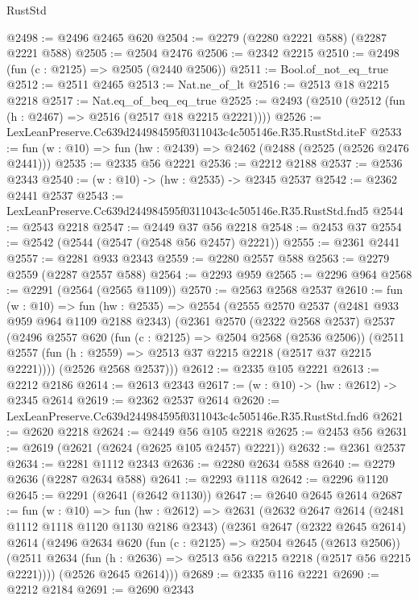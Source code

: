 \begin{lexlean}{RustStd}
\begin{coremodule}
@2498 := @2496 @2465 @620
@2504 := @2279 (@2280 @2221 @588) (@2287 @2221 @588)
@2505 := @2504 @2476
@2506 := @2342 @2215
@2510 := @2498 (fun (c : @2125) => @2505 (@2440 @2506))
@2511 := Bool.of_not_eq_true
@2512 := @2511 @2465
@2513 := Nat.ne_of_lt
@2516 := @2513 @18 @2215 @2218
@2517 := Nat.eq_of_beq_eq_true
@2525 := @2493 (@2510 (@2512 (fun (h : @2467) => @2516 (@2517 @18 @2215 @2221))))
@2526 := LexLeanPreserve.Cc639d244984595f0311043c4c505146e.R35.RustStd.iteF
@2533 := fun (w : @10) => fun (hw : @2439) => @2462 (@2488 (@2525 (@2526 @2476 @2441)))
@2535 := @2335 @56 @2221
@2536 := @2212 @2188
@2537 := @2536 @2343
@2540 := (w : @10) -> (hw : @2535) -> @2345 @2537
@2542 := @2362 @2441 @2537
@2543 := LexLeanPreserve.Cc639d244984595f0311043c4c505146e.R35.RustStd.fnd5
@2544 := @2543 @2218
@2547 := @2449 @37 @56 @2218
@2548 := @2453 @37
@2554 := @2542 (@2544 (@2547 (@2548 @56 @2457) @2221))
@2555 := @2361 @2441
@2557 := @2281 @933 @2343
@2559 := @2280 @2557 @588
@2563 := @2279 @2559 (@2287 @2557 @588)
@2564 := @2293 @959
@2565 := @2296 @964
@2568 := @2291 (@2564 (@2565 @1109))
@2570 := @2563 @2568 @2537
@2610 := fun (w : @10) =>
  fun (hw : @2535) =>
  @2554
    (@2555
      @2570
      @2537
      (@2481 @933 @959 @964 @1109 @2188 @2343)
      (@2361
        @2570
        (@2322 @2568 @2537)
        @2537
        (@2496
          @2557
          @620
          (fun (c : @2125) => @2504 @2568 (@2536 @2506))
          (@2511 @2557 (fun (h : @2559) => @2513 @37 @2215 @2218 (@2517 @37 @2215 @2221))))
        (@2526 @2568 @2537)))
@2612 := @2335 @105 @2221
@2613 := @2212 @2186
@2614 := @2613 @2343
@2617 := (w : @10) -> (hw : @2612) -> @2345 @2614
@2619 := @2362 @2537 @2614
@2620 := LexLeanPreserve.Cc639d244984595f0311043c4c505146e.R35.RustStd.fnd6
@2621 := @2620 @2218
@2624 := @2449 @56 @105 @2218
@2625 := @2453 @56
@2631 := @2619 (@2621 (@2624 (@2625 @105 @2457) @2221))
@2632 := @2361 @2537
@2634 := @2281 @1112 @2343
@2636 := @2280 @2634 @588
@2640 := @2279 @2636 (@2287 @2634 @588)
@2641 := @2293 @1118
@2642 := @2296 @1120
@2645 := @2291 (@2641 (@2642 @1130))
@2647 := @2640 @2645 @2614
@2687 := fun (w : @10) =>
  fun (hw : @2612) =>
  @2631
    (@2632
      @2647
      @2614
      (@2481 @1112 @1118 @1120 @1130 @2186 @2343)
      (@2361
        @2647
        (@2322 @2645 @2614)
        @2614
        (@2496
          @2634
          @620
          (fun (c : @2125) => @2504 @2645 (@2613 @2506))
          (@2511 @2634 (fun (h : @2636) => @2513 @56 @2215 @2218 (@2517 @56 @2215 @2221))))
        (@2526 @2645 @2614)))
@2689 := @2335 @116 @2221
@2690 := @2212 @2184
@2691 := @2690 @2343

\end{coremodule}
\end{lexlean}
